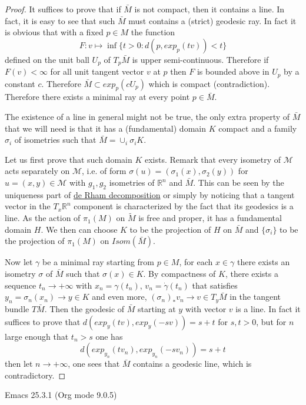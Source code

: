 \documentclass[11pt]{article}
\begin{document}
\begin{proof}
It suffices to prove that if \(\bar M\) is not compact, then it contains a line. In fact, it is easy
to see that such \(\bar M\) must contains a (strict) geodesic ray. In fact it is obvious that with a fixed \(p\in
M\) the function
\[
F: v\mapsto \inf \{t>0: d(p,exp_p(tv)) < t\}
\]
defined on the unit ball \(U_p\) of \(T_p\bar M\) is upper semi-continuous. Therefore if \(F(v)<\infty\)
for all unit tangent vector \(v\) at \(p\) then \(F\) is bounded above in \(U_p\) by a constant \(c\). Therefore
\(\bar M\subset exp_p(cU_p)\) which is compact (contradiction). Therefore there exists a minimal ray
at every point \(p\in \bar M\).

The existence of a line in general might not be true, the only extra property of \(\bar M\) that we
will need is that it has a (fundamental) domain \(K\) compact and a family \(\sigma_i\) of isometries
such that \(\bar M = \cup_i \sigma_i K\).

Let us first prove that such domain \(K\) exists. Remark that every isometry of \(\mathcal{M}\) acts
separately on \(\mathcal{M}\), i.e. of form \(\sigma(u) = (\sigma_1(x), \sigma_2(y))\) for \(u=(x,y)\in
\mathcal{M}\) with \(g_1, g_2\) isometries of \(\mathbb{R}^n\) and \(\bar M\). This can be seen by the
uniqueness part of \href{de-rham-decomposition.org}{de Rham decomposition} or simply by noticing that a tangent vector in the
\(T_x\mathbb{R}^n\) component is characterized by the fact that its geodesics is a line. As the action
of \(\pi_1(M)\) on \(\tilde M\) is free and proper, it has a fundamental domain \(H\). We then can choose
\(K\) to be the projection of \(H\) on \(\bar M\) and \(\{\sigma_i\}\) to be the projection of \(\pi_1(M)\) on
\(Isom(\bar M)\). 

Now let \(\gamma\) be a minimal ray starting from \(p\in M\), for each \(x\in \gamma\) there exists an
isometry \(\sigma\) of \(\bar M\) such that \(\sigma(x)\in K\). By compactness of \(K\), there exists a
sequence \(t_n \to +\infty\) with \(x_n =\gamma(t_n)\), \(v_n = \dot\gamma(t_n)\) that satisfies \(y_n =
\sigma_n(x_n) \to y\in K\) and even more, \((\sigma_n)_* v_n \to v\in T_y\bar M\) in the tangent bundle \(T\bar
M\). Then the geodesic of \(\bar M\) starting at \(y\) with vector \(v\) is a
line. In fact it suffices to prove that \(d(exp_y(t v), exp_y(-s v)) = s+t\) for \(s,t>0\), but for \(n\)
large enough that \(t_n > s\) one has
\[
d(exp_{y_n}(tv_n), exp_{y_n}(-sv_n)) = s+t
\]
then let \(n\to +\infty\), one sees that \(\bar M\) contains a geodesic line, which is contradictory.
\end{proof}
Emacs 25.3.1 (Org mode 9.0.5)
\end{document}

